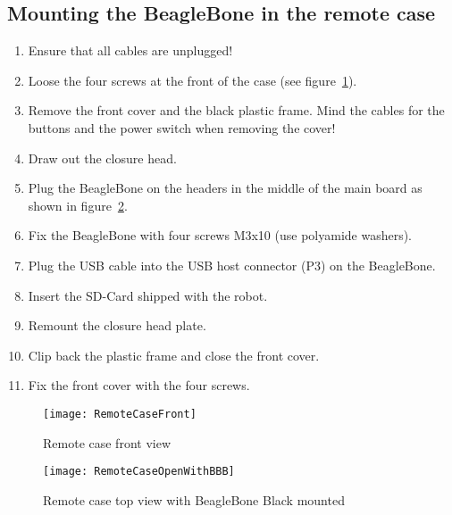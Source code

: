 \subsection{Mounting the BeagleBone in the remote case}
\begin{enumerate}
	\item Ensure that all cables are unplugged!
	\item Loose the four screws at the front of the case (see figure~\ref{fig:RemoteCaseFront}).
	\item Remove the front cover and the black plastic frame. Mind the cables for the buttons and the power switch when removing the cover!
	\item Draw out the closure head.
	\item Plug the BeagleBone on the headers in the middle of the main board as shown in figure~\ref{fig:RemoteCaseOpenWithBBB}.
	\item Fix the BeagleBone with four screws M3x10 (use polyamide washers).
	\item Plug the USB cable into the USB host connector (P3) on the BeagleBone.
	\item Insert the SD-Card shipped with the robot.
	\item Remount the closure head plate.
	\item Clip back the plastic frame and close the front cover.
	\item Fix the front cover with the four screws.
\end{enumerate}

\begin{figure}[htbp]
	\centering
	\texttt{[image: RemoteCaseFront]}
	\caption{Remote case front view}
	\label{fig:RemoteCaseFront}
\end{figure}

\begin{figure}[htbp]
	\centering
	\texttt{[image: RemoteCaseOpenWithBBB]}
	\caption{Remote case top view with BeagleBone Black mounted}
	\label{fig:RemoteCaseOpenWithBBB}
\end{figure}

